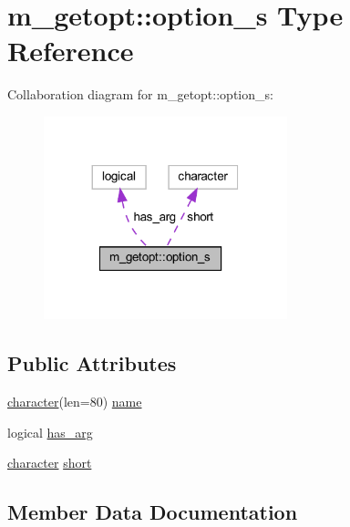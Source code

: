 \hypertarget{structm__getopt_1_1option__s}{}\section{m\+\_\+getopt\+:\+:option\+\_\+s Type Reference}
\label{structm__getopt_1_1option__s}


Collaboration diagram for m\+\_\+getopt\+:\+:option\+\_\+s\+:
\nopagebreak
\begin{figure}[H]
\begin{center}
\leavevmode
\includegraphics[width=200pt]{structm__getopt_1_1option__s__coll__graph}
\end{center}
\end{figure}
\subsection*{Public Attributes}
\begin{DoxyCompactItemize}
\item 
\hyperlink{option__stopwatch_83_8txt_abd4b21fbbd175834027b5224bfe97e66}{character}(len=80) \hyperlink{structm__getopt_1_1option__s_add3050f859164e78b98c04738b4ffb98}{name}
\item 
logical \hyperlink{structm__getopt_1_1option__s_a0d4f42e7ed6f85906d5e8a3600ac26dc}{has\+\_\+arg}
\item 
\hyperlink{option__stopwatch_83_8txt_abd4b21fbbd175834027b5224bfe97e66}{character} \hyperlink{structm__getopt_1_1option__s_a427aa0a11a8f872eed789f0dd6f54459}{short}
\end{DoxyCompactItemize}


\subsection{Member Data Documentation}
\mbox{\label{structm__getopt_1_1option__s_a0d4f42e7ed6f85906d5e8a3600ac26dc}} 
